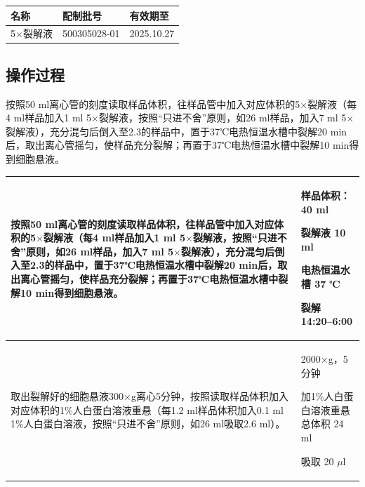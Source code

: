 \documentclass[UTF8,10pt,a4paper,fontset=fandol]{ctexart}
\newcommand{\fieldvalue}[1]{#1}
\newcommand{\handwritten}[1]{#1}
\begin{document}
\begin{center}
\begin{tabular}{|p{3.5cm}|p{6.0cm}|p{4.5cm}|}
\hline
名称 & 配制批号 & 有效期至 \\
\hline
\fieldvalue{5$\times$裂解液} &
\fieldvalue{\handwritten{500305028-01}} &
\fieldvalue{\handwritten{2025.10.27}} \\
\hline
\end{tabular}
\end{center}

\subsection*{操作过程}

按照50 ml离心管的刻度读取样品体积，往样品管中加入对应体积的5$\times$裂解液（每4 ml样品加入1 ml 5$\times$裂解液，按照“只进不舍”原则，如26 ml样品，加入7 ml 5$\times$裂解液），充分混匀后倒入至2.3的样品中，置于37℃电热恒温水槽中裂解20 min后，取出离心管摇匀，使样品充分裂解；再置于37℃电热恒温水槽中裂解10 min得到细胞悬液。

\begin{tabular}{|p{8.3cm}|p{6.0cm}|}
\hline
按照50 ml离心管的刻度读取样品体积，往样品管中加入对应体积的5$\times$裂解液（每4 ml样品加入1 ml 5$\times$裂解液，按照“只进不舍”原则，如26 ml样品，加入7 ml 5$\times$裂解液），充分混匀后倒入至2.3的样品中，置于37℃电热恒温水槽中裂解20 min后，取出离心管摇匀，使样品充分裂解；再置于37℃电热恒温水槽中裂解10 min得到细胞悬液。 &
样品体积：
\fieldvalue{\handwritten{40}} ml

裂解液
\fieldvalue{\handwritten{10}} ml

电热恒温水槽
\fieldvalue{\handwritten{37}} ℃

裂解
\fieldvalue{\handwritten{14:20--6:00}} \\
\hline
取出裂解好的细胞悬液300$\times$g离心5分钟，按照读取样品体积加入对应体积的1\%人白蛋白溶液重悬（每1.2 ml样品体积加入0.1 ml 1\%人白蛋白溶液，按照“只进不舍”原则，如26 ml吸取2.6 ml）。 &
\fieldvalue{\handwritten{2000$\times$g，5分钟}}

加1\%人白蛋白溶液重悬总体积
\fieldvalue{\handwritten{24}} ml

吸取
\fieldvalue{\handwritten{20}} $\mu$l \\
\hline
\end{tabular}
\end{document}
